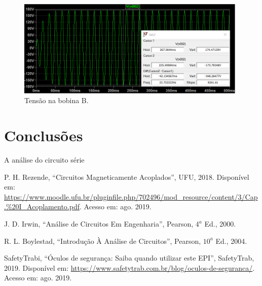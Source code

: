 \documentclass[a4paper,12pt,oneside,openany,table,xcdraw]{article}
\begin{document}
\begin{figure}[H]
\centering
\captionsetup{font=scriptsize}
\includegraphics[width=11cm]{tensao-B2}
\caption{Tensão na bobina B.}
\label{tensao-B2}
\end{figure}

\section{Conclusões} %
A análise do circuito série 

\newpage
\begin{thebibliography}{9} 
    P. H. Rezende,
    “Circuitos Magneticamente Acoplados”, UFU, 2018.
 Disponível em:
 \url{https://www.moodle.ufu.br/pluginfile.php/702496/mod_resource/content/3/Cap.\%20I_Acoplamento.pdf}. Acesso em: ago. 2019.

    J. D. Irwin,
    “Análise de Circuitos Em Engenharia”, Pearson, $4^a$ Ed., 2000.

    R. L. Boylestad,
    “Introdução À Análise de Circuitos”, Pearson, $10^a$ Ed., 2004.

    SafetyTrabi,
    “Óculos de segurança: Saiba quando utilizar este EPI”, SafetyTrab, 2019.
 Disponível em:
 \url{https://www.safetytrab.com.br/blog/oculos-de-seguranca/}. Acesso em: ago. 2019.


\end{thebibliography}
\end{document}
